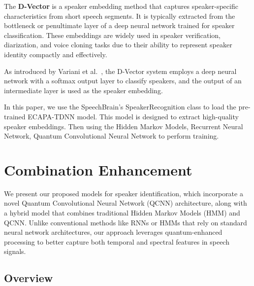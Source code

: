 \documentclass[conference]{IEEEtran}
\begin{document}
The \textbf{D-Vector} is a speaker embedding method that captures speaker-specific
characteristics from short speech segments. It is typically extracted from the
bottleneck or penultimate layer of a deep neural network trained for speaker
classification. These embeddings are widely used in speaker verification,
diarization, and voice cloning tasks due to their ability to represent speaker
identity compactly and effectively.

As introduced by Variani et al.~\cite{variani2014deep}, the D-Vector system employs
a deep neural network with a softmax output layer to classify speakers, and the
output of an intermediate layer is used as the speaker embedding.


In this paper, we use the SpeechBrain's SpeakerRecognition class to load the pre-trained
ECAPA-TDNN model. This model is designed to extract high-quality speaker embeddings.
Then using the Hidden Markov Models, Recurrent Neural Network,
Quantum Convolutional Neural Network to perform training.










\section{Combination Enhancement}

We present our proposed models for speaker identification, which incorporate a novel Quantum Convolutional Neural Network (QCNN) architecture, along with a hybrid model that combines traditional Hidden Markov Models (HMM) and QCNN. Unlike conventional methods like RNNs or HMMs that rely on standard neural network architectures, our approach leverages quantum-enhanced processing to better capture both temporal and spectral features in speech signals.

\subsection{Overview}
\end{document}
